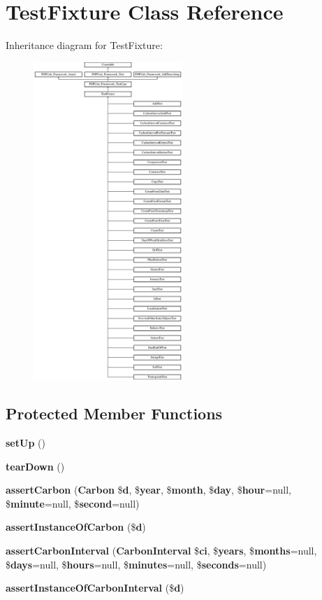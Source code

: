 \section{Test\+Fixture Class Reference}
\label{class_test_fixture}
Inheritance diagram for Test\+Fixture\+:\begin{figure}[H]
\begin{center}
\leavevmode
\includegraphics[height=12.000000cm]{class_test_fixture}
\end{center}
\end{figure}
\subsection*{Protected Member Functions}
\begin{DoxyCompactItemize}
\item 
{\bf set\+Up} ()
\item 
{\bf tear\+Down} ()
\item 
{\bf assert\+Carbon} ({\bf Carbon} \${\bf d}, \${\bf year}, \${\bf month}, \${\bf day}, \${\bf hour}=null, \${\bf minute}=null, \${\bf second}=null)
\item 
{\bf assert\+Instance\+Of\+Carbon} (\${\bf d})
\item 
{\bf assert\+Carbon\+Interval} ({\bf Carbon\+Interval} \${\bf ci}, \${\bf years}, \${\bf months}=null, \${\bf days}=null, \${\bf hours}=null, \${\bf minutes}=null, \${\bf seconds}=null)
\item 
{\bf assert\+Instance\+Of\+Carbon\+Interval} (\${\bf d})
\end{DoxyCompactItemize}
